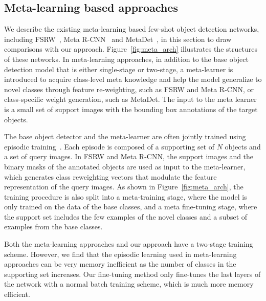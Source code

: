 \documentclass{article}
\begin{document}
\subsection{Meta-learning based approaches}
\label{sec:meta}
We describe the existing meta-learning based few-shot object detection networks, including FSRW~\cite{kang2019few}, Meta R-CNN~\cite{yan2019meta} and MetaDet~\cite{wang2019meta}, in 
this section to draw comparisons with our approach.
Figure~\ref{fig:meta_arch} illustrates the structures of these networks.
In meta-learning approaches, in addition to the base object detection model that is either single-stage or 
two-stage, a meta-learner is introduced to acquire class-level meta knowledge and
help the model generalize to novel classes through feature re-weighting, such as FSRW
and Meta R-CNN, or class-specific weight generation, such as MetaDet. The input to the
meta learner is a small set of support images with the bounding box annotations of the target objects. 

The base object detector and the meta-learner are often jointly trained using episodic training~\cite{vinyals2016matching}.
Each episode is composed of a supporting set of $N$ objects and a set of query images.
In FSRW and Meta R-CNN, the support images and the binary masks of the annotated objects are used as input to the meta-learner, which generates class reweighting vectors that modulate the feature representation of the query images.
As shown in Figure~\ref{fig:meta_arch}, the training procedure is also split into a meta-training stage, where the model is only trained on the data of the base classes, and a meta fine-tuning stage, where the support set includes the few examples of the novel classes and a subset of examples from the base classes.

Both the meta-learning approaches and our approach have a two-stage 
training scheme. However, we find that the episodic learning used in meta-learning approaches 
can be very memory inefficient as the number of classes in the supporting set increases. Our
fine-tuning method only fine-tunes the last layers of the network with a normal batch training scheme, which is much more memory efficient. 
\end{document}
